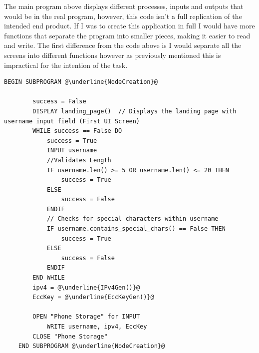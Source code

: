 \documentclass[a4paper, titlepage]{article}
\begin{document}
The main program above displays different processes, inputs and outputs that would be in the real program, however, this code isn't a full replication of the intended end product. If I was to create this application in full I would have more functions that separate the program into smaller pieces, making it easier to read and write. The first difference from the code above is I would separate all the screens into different functions however as previously mentioned this is impractical for the intention of the task.

\begin{lstlisting}[caption=Node Creation, escapechar=\@]
	BEGIN SUBPROGRAM @\underline{NodeCreation}@

		success = False
		DISPLAY landing_page()	// Displays the landing page with username input field (First UI Screen)
		WHILE success == False DO
			success = True
			INPUT username
			//Validates Length
			IF username.len() >= 5 OR username.len() <= 20 THEN
				success = True
			ELSE
				success = False
			ENDIF
			// Checks for special characters within username
			IF username.contains_special_chars() == False THEN
				success = True
			ELSE
				success = False
			ENDIF
		END WHILE
		ipv4 = @\underline{IPv4Gen()}@
		EccKey = @\underline{EccKeyGen()}@

		OPEN "Phone Storage" for INPUT
			WRITE username, ipv4, EccKey
		CLOSE "Phone Storage"
	END SUBPROGRAM @\underline{NodeCreation}@
\end{lstlisting}
\end{document}
